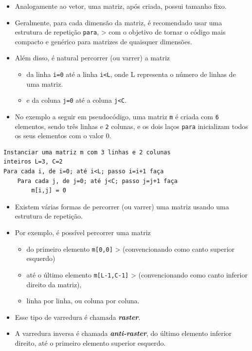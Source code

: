 \documentclass[12pt,a4paper]{article}
\providecommand{\tightlist}{%
      \setlength{\itemsep}{0pt}\setlength{\parskip}{0pt}}
\begin{document}
    \begin{itemize}
\tightlist
\item
  Analogamente ao vetor, uma matriz, após criada, possui tamanho fixo.
\item
  Geralmente, para cada dimensão da matriz, é recomendado usar uma
  estrutura de repetição \texttt{para}, \textgreater{} com o objetivo de
  tornar o código mais compacto e genérico para matrizes de quaisquer
  dimensões.
\item
  Além disso, é natural percorrer (ou varrer) a matriz

  \begin{itemize}
  \tightlist
  \item
    da linha \texttt{i=0} até a linha \texttt{i\textless{}L}, onde L
    representa o número de linhas de uma matriz.
  \item
    e da coluna \texttt{j=0} até a coluna \texttt{j\textless{}C}.
  \end{itemize}
\item
  No exemplo a seguir em pseudocódigo, uma matriz \texttt{m} é criada
  com \texttt{6} elementos, sendo três linhas e \texttt{2} colunas, e os
  dois laços \texttt{para} inicializam todos os seus elementos com o
  valor 0.
\end{itemize}

    \begin{verbatim}
Instanciar uma matriz m com 3 linhas e 2 colunas 
inteiros L=3, C=2
Para cada i, de i=0; até i<L; passo i=i+1 faça
    Para cada j, de j=0; até j<C; passo j=j+1 faça
        m[i,j] = 0
\end{verbatim}

    \begin{itemize}
\item
  Existem várias formas de percorrer (ou varrer) uma matriz usando uma
  estrutura de repetição.
\item
  Por exemplo, é possível percorrer uma matriz

  \begin{itemize}
  \tightlist
  \item
    do primeiro elemento \texttt{m{[}0,0{]}} \textgreater{}
    (convencionando como canto superior esquerdo)
  \item
    até o último elemento \texttt{m{[}L-1,C-1{]}} \textgreater{}
    (convencionando como canto inferior direito da matriz),
  \item
    linha por linha, ou coluna por coluna.
  \end{itemize}
\item
  Esse tipo de varredura é chamada \textbf{\emph{raster}}.
\item
  A varredura inversa é chamada \textbf{\emph{anti-raster}}, do último
  elemento inferior direito, até o primeiro elemento superior esquerdo.
\end{itemize}
\end{document}
